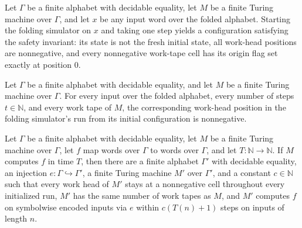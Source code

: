 \begin{lemma}
\label{Turing.FinTM.foldSafe_init}
\leanok
{}
Let $\Gamma$ be a finite alphabet with decidable equality, let $M$ be a finite Turing
machine over $\Gamma$, and let $x$ be any input word over the folded alphabet. Starting
the folding simulator on $x$ and taking one step yields a configuration satisfying the
safety invariant: its state is not the fresh initial state, all work-head positions are
nonnegative, and every nonnegative work-tape cell has its origin flag set exactly at
position $0$.
\end{lemma}

\begin{lemma}
\label{Turing.FinTM.foldTM_nonnegative}
\leanok
{}
Let $\Gamma$ be a finite alphabet with decidable equality, and let $M$ be a finite
Turing machine over $\Gamma$. For every input over the folded alphabet, every number of
steps $t\in\mathbb{N}$, and every work tape of $M$, the corresponding work-head position
in the folding simulator's run from its initial configuration is nonnegative.
\end{lemma}

\begin{theorem}
\label{Turing.FinTM.nonnegative_heads}
\leanok
{}
Let $\Gamma$ be a finite alphabet with decidable equality, let $M$ be a finite Turing
machine over $\Gamma$, let $f$ map words over $\Gamma$ to words over $\Gamma$, and let
$T\colon\mathbb N\to\mathbb N$. If $M$ computes $f$ in time $T$, then there are a finite
alphabet $\Gamma'$ with decidable equality, an injection
$e\colon\Gamma\hookrightarrow\Gamma'$, a finite Turing machine $M'$ over $\Gamma'$, and
a constant $c\in\mathbb N$ such that every work head of $M'$ stays at a nonnegative cell
throughout every initialized run, $M'$ has the same number of work tapes as $M$, and
$M'$ computes $f$ on symbolwise encoded inputs via $e$ within $c(T(n)+1)$ steps on
inputs of length $n$.
\end{theorem}
